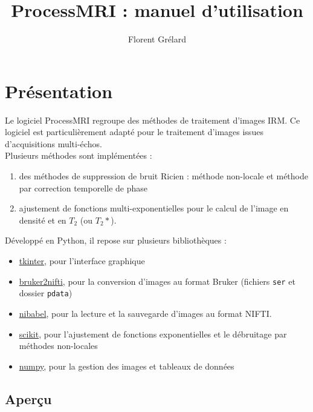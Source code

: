\documentclass[french]{article}
\begin{document}
\title{ProcessMRI : manuel d'utilisation}

\author{Florent Grélard}

\maketitle

\newpage

\section{Présentation}
Le logiciel ProcessMRI regroupe des méthodes de traitement d'images IRM. Ce logiciel est particulièrement adapté pour le traitement d'images issues d'acquisitions multi-échos. \\

Plusieurs méthodes sont implémentées :
\begin{enumerate}
\item des méthodes de suppression de bruit Ricien : méthode non-locale
  et méthode par correction temporelle de phase
\item ajustement de fonctions multi-exponentielles pour le calcul de
  l'image en densité et en $T_2$ (ou $T_2*$).
\end{enumerate}

Développé en Python, il repose sur plusieurs bibliothèques :
\begin{itemize}
\item \href{https://pypi.org/project/tkinter/}{tkinter}, pour l'interface graphique
\item \href{https://pypi.org/project/bruker2nifti/}{bruker2nifti}, pour la conversion d'images au format Bruker
  (fichiers \texttt{ser} et dossier \texttt{pdata})
\item \href{https://pypi.org/project/nibabel/}{nibabel}, pour la lecture et la sauvegarde d'images au format
  NIFTI.
\item \href{https://pypi.org/project/scikit/}{scikit}, pour l'ajustement de fonctions exponentielles et le
  débruitage par méthodes non-locales
\item \href{https://pypi.org/project/numpy/}{numpy}, pour la gestion des images et tableaux de données
\end{itemize}

\subsection{Aperçu}
\label{sec:apercu}
\end{document}
